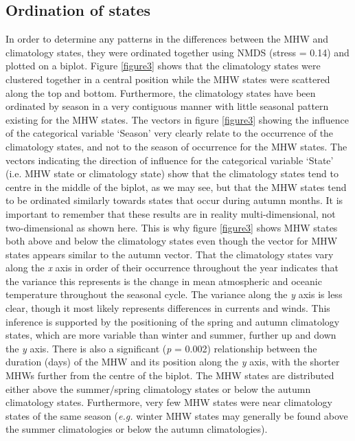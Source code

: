 \documentclass[utf8]{frontiersSCNS}
\begin{document}
\subsection{Ordination of states}
In order to determine any patterns in the differences between the MHW and climatology states, they were ordinated together using NMDS (stress = 0.14) and plotted on a biplot. Figure \ref{figure3} shows that the climatology states were clustered together in a central position while the MHW states were scattered along the top and bottom. Furthermore, the climatology states have been ordinated by season in a very contiguous manner with little seasonal pattern existing for the MHW states. The vectors in figure \ref{figure3} showing the influence of the categorical variable `Season' very clearly relate to the occurrence of the climatology states, and not to the season of occurrence for the MHW states. The vectors indicating the direction of influence for the categorical variable `State' (i.e. MHW state or climatology state) show that the climatology states tend to centre in the middle of the biplot, as we may see, but that the MHW states tend to be ordinated similarly towards states that occur during autumn months. It is important to remember that these results are in reality multi-dimensional, not two-dimensional as shown here. This is why figure \ref{figure3} shows MHW states both above and below the climatology states even though the vector for MHW states appears similar to the autumn vector. That the climatology states vary along the \emph{x} axis in order of their occurrence throughout the year indicates that the variance this represents is the change in mean atmospheric and oceanic temperature throughout the seasonal cycle. The variance along the \emph{y} axis is less clear, though it most likely represents differences in currents and winds. This inference is supported by the positioning of the spring and autumn climatology states, which are more variable than winter and summer, further up and down the \emph{y} axis. There is also a significant (\emph{p} = 0.002) relationship between the duration (days) of the MHW and its position along the \emph{y} axis, with the shorter MHWs further from the centre of the biplot. The MHW states are distributed either above the summer/spring climatology states or below the autumn climatology states. Furthermore, very few MHW states were near climatology states of the same season (\emph{e.g.} winter MHW states may generally be found above the summer climatologies or below the autumn climatologies). 
\end{document}
